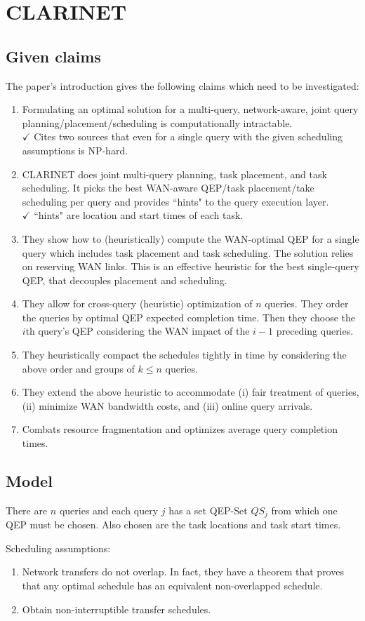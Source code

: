 \section{CLARINET}

\subsection{Given claims}

The paper's introduction gives the following claims which need to be investigated:

\begin{enumerate}
	\item Formulating an optimal solution for a multi-query, network-aware, joint query planning/placement/scheduling is computationally intractable. \\
	$\checkmark$ Cites two sources that even for a single query with the given scheduling assumptions is NP-hard.
	\item CLARINET does joint multi-query planning, task placement, and task scheduling.
	It picks the best WAN-aware QEP/task placement/take scheduling per query and provides ``hints" to the query execution layer.\\
	$\checkmark$ ``hints" are location and start times of each task.
	\item They show how to (heuristically) compute the WAN-optimal QEP for a single query which includes task placement and task scheduling.
	The solution relies on reserving WAN links.
	This is an effective heuristic for the best single-query QEP, that decouples placement and scheduling.
	\item They allow for cross-query (heuristic) optimization of $n$ queries.
	They order the queries by optimal QEP expected completion time.
	Then they choose the $i$th query's QEP considering the WAN impact of the $i-1$ preceding queries.
	\item They heuristically compact the schedules tightly in time by considering the above order and groups of $k\leq n$ queries.
	\item They extend the above heuristic to accommodate (i) fair treatment of queries, (ii) minimize WAN bandwidth costs, and (iii) online query arrivals.
	\item Combats resource fragmentation and optimizes average query completion times.
\end{enumerate}

\subsection{Model}
There are $n$ queries and each query $j$ has a set QEP-Set $QS_j$ from which one QEP must be chosen.
Also chosen are the task locations and task start times.

Scheduling assumptions:
\begin{enumerate}
	\item Network transfers do not overlap.
	In fact, they have a theorem that proves that any optimal schedule has an equivalent non-overlapped schedule.
	\item Obtain non-interruptible transfer schedules.
\end{enumerate}